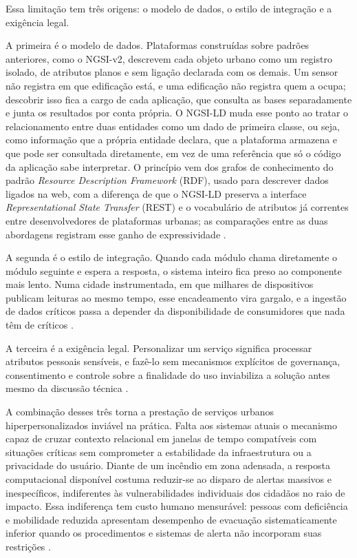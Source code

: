 Essa limitação tem três origens: o modelo de dados, o estilo de integração e a exigência legal.

A primeira é o modelo de dados. Plataformas construídas sobre padrões anteriores, como o NGSI-v2, descrevem cada objeto urbano como um registro isolado, de atributos planos e sem ligação declarada com os demais. Um sensor não registra em que edificação está, e uma edificação não registra quem a ocupa; descobrir isso fica a cargo de cada aplicação, que consulta as bases separadamente e junta os resultados por conta própria. O NGSI-LD muda esse ponto ao tratar o relacionamento entre duas entidades como um dado de primeira classe, ou seja, como informação que a própria entidade declara, que a plataforma armazena e que pode ser consultada diretamente, em vez de uma referência que só o código da aplicação sabe interpretar. O princípio vem dos grafos de conhecimento do padrão \textit{Resource Description Framework} (RDF), usado para descrever dados ligados na web, com a diferença de que o NGSI-LD preserva a interface \textit{Representational State Transfer} (REST) e o vocabulário de atributos já correntes entre desenvolvedores de plataformas urbanas; as comparações entre as duas abordagens registram esse ganho de expressividade \cite{abid2022toward,viola2019mapping}.

A segunda é o estilo de integração. Quando cada módulo chama diretamente o módulo seguinte e espera a resposta, o sistema inteiro fica preso ao componente mais lento. Numa cidade instrumentada, em que milhares de dispositivos publicam leituras ao mesmo tempo, esse encadeamento vira gargalo, e a ingestão de dados críticos passa a depender da disponibilidade de consumidores que nada têm de críticos \cite{eugster2003many,francesco2017research}.

A terceira é a exigência legal. Personalizar um serviço significa processar atributos pessoais sensíveis, e fazê-lo sem mecanismos explícitos de governança, consentimento e controle sobre a finalidade do uso inviabiliza a solução antes mesmo da discussão técnica \cite{cuno2019data,firdausy2022towards,brasil2018lgpd}.

A combinação desses três torna a prestação de serviços urbanos hiperpersonalizados inviável na prática. Falta aos sistemas atuais o mecanismo capaz de cruzar contexto relacional em janelas de tempo compatíveis com situações críticas sem comprometer a estabilidade da infraestrutura ou a privacidade do usuário. Diante de um incêndio em zona adensada, a resposta computacional disponível costuma reduzir-se ao disparo de alertas massivos e inespecíficos, indiferentes às vulnerabilidades individuais dos cidadãos no raio de impacto. Essa indiferença tem custo humano mensurável: pessoas com deficiência e mobilidade reduzida apresentam desempenho de evacuação sistematicamente inferior quando os procedimentos e sistemas de alerta não incorporam suas restrições \cite{hashemi2018emergency}.


